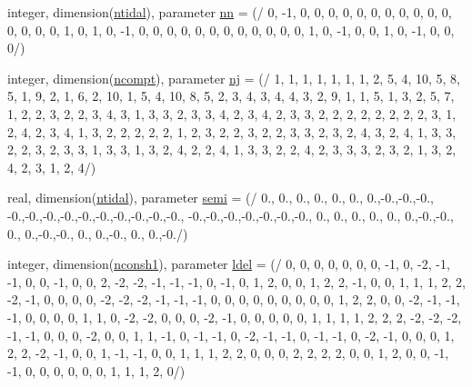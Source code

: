 \begin{DoxyCompactItemize}
\item 
integer, dimension(\mbox{\hyperlink{namespacemoduletoga_ae4b0b997b6803ae8647fdd97f2dda666}{ntidal}}), parameter \mbox{\hyperlink{namespacemoduletoga_a81315410d16519be6056987f27dd8dd9}{nn}} = (/ 0, -\/1, 0, 0, 0, 0, 0, 0, 0, 0, 0, 0, 0, 0, 0, 0, 0, 1, 0, 1, 0, -\/1, 0, 0, 0, 0, 0, 0, 0, 0, 0, 0, 0, 0, 1, 0, -\/1, 0, 0, 1, 0, -\/1, 0, 0, 0/)
\item 
integer, dimension(\mbox{\hyperlink{namespacemoduletoga_a151be23f63401a1bb1a76f0a4c30d9ca}{ncompt}}), parameter \mbox{\hyperlink{namespacemoduletoga_a35b3164d881bfedd7e51ef9b88f7251a}{nj}} = (/ 1, 1, 1, 1, 1, 1, 1, 2, 5, 4, 10, 5, 8, 5, 1, 9, 2, 1, 6, 2, 10, 1, 5, 4, 10, 8, 5, 2, 3, 4, 3, 4, 4, 3, 2, 9, 1, 1, 5, 1, 3, 2, 5, 7, 1, 2, 2, 3, 2, 2, 3, 4, 3, 1, 3, 3, 2, 3, 3, 4, 2, 3, 4, 2, 3, 3, 2, 2, 2, 2, 2, 2, 2, 2, 3, 1, 2, 4, 2, 3, 4, 1, 3, 2, 2, 2, 2, 2, 1, 2, 3, 2, 2, 3, 2, 2, 3, 3, 2, 3, 2, 4, 3, 2, 4, 1, 3, 3, 2, 2, 3, 2, 3, 3, 1, 3, 3, 1, 3, 2, 4, 2, 2, 4, 1, 3, 3, 2, 2, 4, 2, 3, 3, 3, 2, 3, 2, 1, 3, 2, 4, 2, 3, 1, 2, 4/)
\item 
real, dimension(\mbox{\hyperlink{namespacemoduletoga_ae4b0b997b6803ae8647fdd97f2dda666}{ntidal}}), parameter \mbox{\hyperlink{namespacemoduletoga_a50b0081d60454bd6a0be5d7521a43c30}{semi}} = (/ 0., 0., 0., 0., 0., 0., 0.,-\/0.,-\/0.,-\/0., -\/0.,-\/0.,-\/0.,-\/0.,-\/0.,-\/0.,-\/0.,-\/0.,-\/0.,-\/0., -\/0.,-\/0.,-\/0.,-\/0.,-\/0.,-\/0.,-\/0., 0., 0., 0., 0., 0., 0.,-\/0.,-\/0., 0., 0.,-\/0.,-\/0., 0., 0.,-\/0., 0., 0.,-\/0./)
\item 
integer, dimension(\mbox{\hyperlink{namespacemoduletoga_a06e41646ba24c11ab2e1b513e5c1760c}{nconsh1}}), parameter \mbox{\hyperlink{namespacemoduletoga_a452c366ecc44674354e6166ee7ae0e3b}{ldel}} = (/ 0, 0, 0, 0, 0, 0, 0, -\/1, 0, -\/2, -\/1, -\/1, 0, 0, -\/1, 0, 0, 2, -\/2, -\/2, -\/1, -\/1, -\/1, 0, -\/1, 0, 1, 2, 0, 0, 1, 2, 2, -\/1, 0, 0, 1, 1, 1, 2, 2, -\/2, -\/1, 0, 0, 0, 0, -\/2, -\/2, -\/2, -\/1, -\/1, -\/1, 0, 0, 0, 0, 0, 0, 0, 0, 0, 1, 2, 2, 0, 0, -\/2, -\/1, -\/1, -\/1, 0, 0, 0, 0, 1, 1, 0, -\/2, -\/2, 0, 0, 0, -\/2, -\/1, 0, 0, 0, 0, 0, 1, 1, 1, 1, 2, 2, 2, -\/2, -\/2, -\/2, -\/1, -\/1, 0, 0, 0, -\/2, 0, 0, 1, 1, -\/1, 0, -\/1, -\/1, 0, -\/2, -\/1, -\/1, 0, -\/1, -\/1, 0, -\/2, -\/1, 0, 0, 0, 1, 2, 2, -\/2, -\/1, 0, 0, 1, -\/1, -\/1, 0, 0, 1, 1, 1, 2, 2, 0, 0, 0, 2, 2, 2, 2, 0, 0, 1, 2, 0, 0, -\/1, -\/1, 0, 0, 0, 0, 0, 0, 1, 1, 1, 2, 0/)

\end{DoxyCompactItemize}
